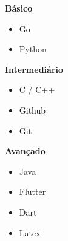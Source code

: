 \documentclass[10pt,a4paper,ragged2e]{altacv}
\begin{document}

{}

{\Large \textbf{Básico}\par\par}
\vspace{5pt}
\begin{itemize}
    \item Go
    \item Python
\end{itemize}

{\Large \textbf{Intermediário}\par\par}
\vspace{5pt}
\begin{itemize}
    \item C / C++
    \item Github 
    \item Git 
\end{itemize}

{\Large \textbf{Avançado}\par\par}
\vspace{5pt}
\begin{itemize}
\item Java
\item Flutter
\item Dart 
\item Latex
\end{itemize} 



\end{document}
